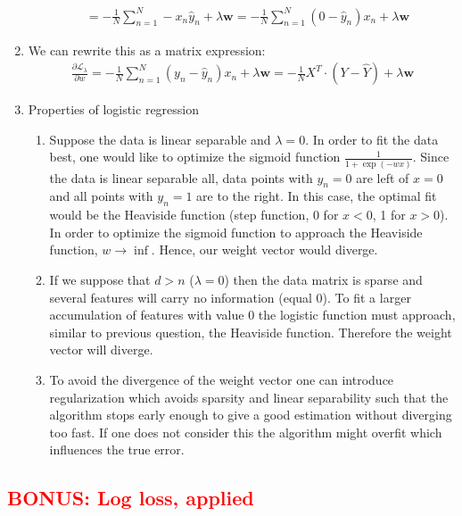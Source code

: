 \documentclass[12pt]{article}
\begin{document}
\begin{enumerate}
\begin{align*}
	&= -\frac{1}{N} \sum_{n=1}^{N}  -x_n\hat{y}_n + \lambda\textbf{w} = 
	-\frac{1}{N} \sum_{n=1}^{N} (0- \hat{y}_n)x_n + \lambda\textbf{w} 
	\end{align*}
	\item We can rewrite this as a matrix expression:
	\begin{align*}
	\frac{\partial \mathcal{L}_\lambda}{\partial w} = -\frac{1}{N} \sum_{n=1}^{N} \left( y_n - \hat{y}_n \right) x_n + \lambda \textbf{w} = - \frac{1}{N} X^T \cdot \left( Y - \hat{Y} \right) + \lambda \textbf{w}
	\end{align*} 
	\item Properties of logistic regression
	\begin{enumerate}[label=(\alph*)]
		\item Suppose the data is linear separable and $\lambda=0$. In order to fit the data best, one would like to optimize the sigmoid function $\frac{1}{1+\exp(-wx)}$. Since the data is linear separable all, data points with $y_n=0$ are left of $x=0$ and all points with $y_n=1$ are to the right. In this case, the optimal fit would be the Heaviside function (step function, 0 for $x<0$, 1 for $x>0$). In order to optimize the sigmoid function to approach the Heaviside function, $w\rightarrow \inf$. Hence, our weight vector would diverge. 
		\item If we suppose that $d>n$ ($\lambda=0$) then the data matrix is sparse and several features will carry no information (equal 0). To fit a larger accumulation of features with value 0 the logistic function must approach, similar to previous question, the Heaviside function. Therefore the weight vector will diverge.
		\item To avoid the divergence of the weight vector one can introduce regularization which avoids sparsity and linear separability such that the algorithm stops early enough to give a good estimation without diverging too fast. If one does not consider this the algorithm might overfit which influences the true error.
	\end{enumerate}
						
\end{enumerate}

\subsection{\textcolor{red}{BONUS: Log loss, applied}}
\end{document}
